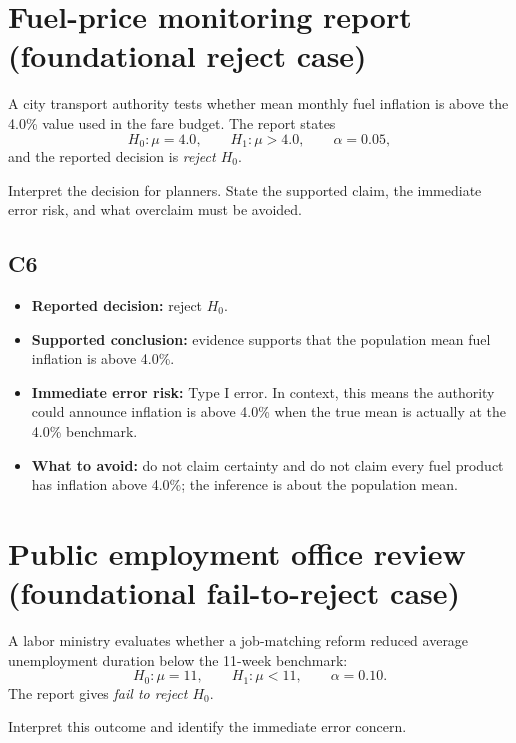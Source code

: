 \begin{ExamProblems}
\item
\section{Fuel-price monitoring report (foundational reject case)}
A city transport authority tests whether mean monthly fuel inflation is above the 4.0\% value used in the fare budget. The report states
\[
H_0\colon \mu=4.0,\qquad H_1\colon \mu>4.0,\qquad \alpha=0.05,
\]
and the reported decision is \textit{reject \(H_0\)}.

Interpret the decision for planners. State the supported claim, the immediate error risk, and what overclaim must be avoided.

\subsection*{C6}
\begin{itemize}
    \item \textbf{Reported decision:} reject \(H_0\).
    \item \textbf{Supported conclusion:} evidence supports that the population mean fuel inflation is above 4.0\%.
    \item \textbf{Immediate error risk:} Type I error. In context, this means the authority could announce inflation is above 4.0\% when the true mean is actually at the 4.0\% benchmark.
    \item \textbf{What to avoid:} do not claim certainty and do not claim every fuel product has inflation above 4.0\%; the inference is about the population mean.
\end{itemize}

\item
\section{Public employment office review (foundational fail-to-reject case)}
A labor ministry evaluates whether a job-matching reform reduced average unemployment duration below the 11-week benchmark:
\[
H_0\colon \mu=11,\qquad H_1\colon \mu<11,\qquad \alpha=0.10.
\]
The report gives \textit{fail to reject \(H_0\)}.

Interpret this outcome and identify the immediate error concern.


\end{ExamProblems}
